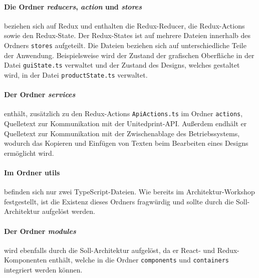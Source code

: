 \paragraph{Die Ordner \emph{reducers}, \emph{action} und \emph{stores}} beziehen sich auf Redux und enthalten die Redux-Reducer, die Redux-Actions sowie den Redux-State. Der Redux-States ist auf mehrere Dateien innerhalb des Ordners \lstinline|stores| aufgeteilt. Die Dateien beziehen sich auf unterschiedliche Teile der Anwendung. Beispielsweise wird der Zustand der grafischen Oberfläche in der Datei \lstinline|guiState.ts| verwaltet und der Zustand des Designs, welches gestaltet wird, in der Datei \lstinline|productState.ts| verwaltet. 

\paragraph{Der Ordner \emph{services}} enthält, zusätzlich zu den Redux-Actions \lstinline|ApiActions.ts| im Ordner \lstinline|actions|,  Quelletext zur Kommunikation mit der Unitedprint-API. Außerdem endhält er Quelletext zur Kommunikation mit der Zwischenablage des Betriebssystems, wodurch das Kopieren und Einfügen von Texten beim Bearbeiten eines Designs ermöglicht wird.


\paragraph{Im Ordner utils} befinden sich nur zwei TypeScript-Dateien. Wie bereits im Architektur-Workshop festgestellt, ist die Existenz dieses Ordners fragwürdig und sollte durch die Soll-Architektur aufgelöst werden.  

\paragraph{Der Ordner \emph{modules}} wird ebenfalls durch die Soll-Architektur aufgelöst, da er React- und Redux-Komponenten enthält, welche in die Ordner \lstinline|components| und \lstinline|containers| integriert werden können.

